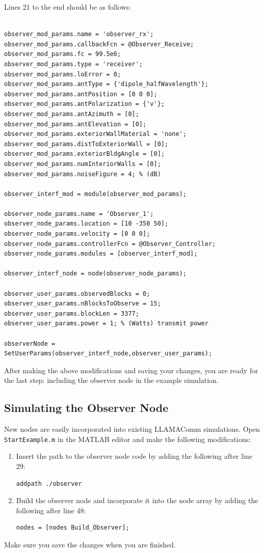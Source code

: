 Lines 21 to the end should be as follows:
%
\begin{lstlisting}[firstnumber = 21]
% Build observer node

observer_mod_params.name = 'observer_rx';
observer_mod_params.callbackFcn = @Observer_Receive;
observer_mod_params.fc = 99.5e6;
observer_mod_params.type = 'receiver';
observer_mod_params.loError = 0;
observer_mod_params.antType = {'dipole_halfWavelength'};
observer_mod_params.antPosition = [0 0 0];
observer_mod_params.antPolarization = {'v'};
observer_mod_params.antAzimuth = [0];
observer_mod_params.antElevation = [0];
observer_mod_params.exteriorWallMaterial = 'none';
observer_mod_params.distToExteriorWall = [0];
observer_mod_params.exteriorBldgAngle = [0];
observer_mod_params.numInteriorWalls = [0];
observer_mod_params.noiseFigure = 4; % (dB)

observer_interf_mod = module(observer_mod_params);

observer_node_params.name = 'Observer_1';
observer_node_params.location = [10 -350 50];
observer_node_params.velocity = [0 0 0];
observer_node_params.controllerFcn = @Observer_Controller;
observer_node_params.modules = [observer_interf_mod];

observer_interf_node = node(observer_node_params);

observer_user_params.observedBlocks = 0;
observer_user_params.nBlocksToObserve = 15;
observer_user_params.blockLen = 3377;
observer_user_params.power = 1; % (Watts) transmit power

observerNode = SetUserParams(observer_interf_node,observer_user_params);
\end{lstlisting}
%

After making the above modifications and saving your changes, you are ready for the last step: including the observer node in the example simulation.

\subsection{Simulating the Observer Node}

New nodes are easily incorporated into existing LLAMAComm simulations.  Open \verb+StartExample.m+ in the MATLAB editor and make the following modifications:

\begin{enumerate}
\item  Insert the path to the observer node code by adding the following after line 29:

\begin{lstlisting}[numbers=none]
addpath ./observer
\end{lstlisting}

\item Build the observer node and incorporate it into the node array by adding the following after line 48:

\begin{lstlisting}[numbers=none]
nodes = [nodes Build_Observer];
\end{lstlisting}

\end{enumerate}
Make sure you save the changes when you are finished.

